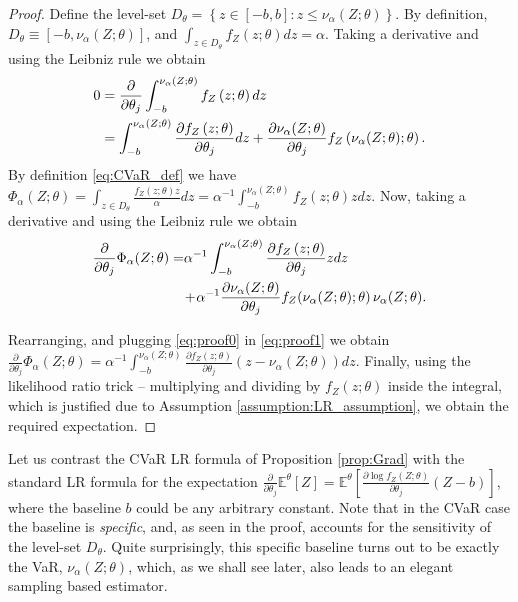 \documentclass[letterpaper]{article}
\newcommand{\E}{\mathbb{E}}
\newcommand{\cvar}{\Phi_\alpha}
\newcommand{\var}{\nu_\alpha}
\newcommand{\Dth}{\frac{\partial}{\partial \theta_j}}
\newcommand{\Dt}[1]{\frac{\partial {#1}}{\partial \theta_j}}
\begin{document}
\begin{proof}
Define the level-set $D_{\theta} \!=\! \left\{ \!z\in [-b,b] : z \leq \var\!(Z;\theta) \right\}.$
By definition, $D_\theta \equiv [-b, \var(Z;\theta) ]$, and
$
\int_{z\in D_{\theta}}f_Z\left(z;\theta\right)dz=\alpha.
$
Taking a derivative and using the Leibniz rule we obtain
\begin{equation}\label{eq:proof0}
\begin{split}
0 &= \Dth \int_{-b}^{\var(Z;\theta)}f_Z\left(z;\theta\right)dz \\
 &= \int_{-b}^{\var(Z;\theta)}\Dt{ f_Z\left(z;\theta\right)}dz
 +\Dt{ \var(Z;\theta)} f_Z\left(\var(Z;\theta);\theta\right).
 \end{split}\raisetag{3.4\baselineskip}
\end{equation}
By definition \eqref{eq:CVaR_def} we have
$
\cvar (Z;\theta)=\int_{z\in D_{\theta}}\frac{f_Z\left(z;\theta\right)z}{\alpha}dz
= \alpha^{-1}\int_{-b}^{\var(Z;\theta)}f_Z\left(z;\theta\right)z dz.
$
Now, taking a derivative and using the Leibniz rule we obtain
\begin{equation}\label{eq:proof1}
\begin{split}
\Dth \cvar (Z;\theta)
=& \alpha^{-1} \int_{-b}^{\var(Z;\theta)}\Dt{f_Z\left(z;\theta\right)}z dz \\
&\!+\! \alpha^{-1} \Dt{ \var(Z;\theta)} f_Z \! \left(\var(Z;\theta);\theta\right)\var(Z;\theta).
\end{split}\raisetag{3.4\baselineskip}
\end{equation}

Rearranging, and plugging \eqref{eq:proof0} in \eqref{eq:proof1} we obtain
$
\Dth \cvar (Z;\theta)=
\alpha^{-1} \int_{-b}^{\var(Z;\theta)}\Dt{ f_Z\left(z;\theta\right)}\left(z - \var(Z;\theta)\right)dz.
$
Finally, using the likelihood ratio trick -- multiplying and dividing
by $f_Z\left(z;\theta\right)$ inside the integral, which is justified due to Assumption \ref{assumption:LR_assumption}, we obtain the required expectation.
\end{proof}

Let us contrast the CVaR LR formula of Proposition \ref{prop:Grad} with the standard LR formula for the expectation \cite{glynn1990likelihood} $\Dth \E^{\theta}[Z] = \E^{\theta}\left[\Dt{ \log f_Z(Z;\theta)}(Z-b)\right]$, where the baseline $b$ could be any arbitrary constant. Note that in the CVaR case the baseline is \emph{specific}, and, as seen in the proof, accounts for the sensitivity of the level-set $D_{\theta}$.
Quite surprisingly, this specific baseline turns out to be exactly the VaR, $\var(Z;\theta)$, which, as we shall see later, also leads to an elegant sampling based estimator.
\end{document}

